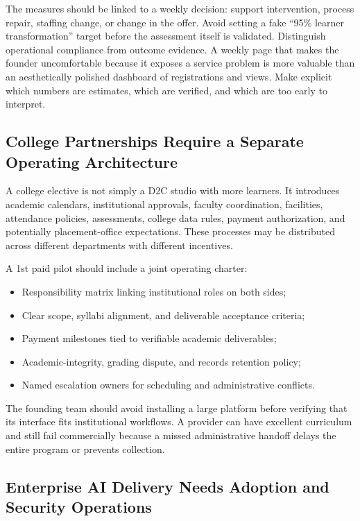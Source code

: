 The measures should be linked to a weekly decision: support intervention, process repair, staffing change, or change in the offer. Avoid setting a fake ``95\% learner transformation'' target before the assessment itself is validated. Distinguish operational compliance from outcome evidence. A weekly page that makes the founder uncomfortable because it exposes a service problem is more valuable than an aesthetically polished dashboard of registrations and views. Make explicit which numbers are estimates, which are verified, and which are too early to interpret.

\subsection{College Partnerships Require a Separate Operating Architecture}
\label{sec:bayes_college_partnerships}

A college elective is not simply a D2C studio with more learners. It introduces academic calendars, institutional approvals, faculty coordination, facilities, attendance policies, assessments, college data rules, payment authorization, and potentially placement-office expectations. These processes may be distributed across different departments with different incentives.

A 1st paid pilot should include a joint operating charter:
\begin{itemize}
    \item Responsibility matrix linking institutional roles on both sides;
    \item Clear scope, syllabi alignment, and deliverable acceptance criteria;
    \item Payment milestones tied to verifiable academic deliverables;
    \item Academic-integrity, grading dispute, and records retention policy;
    \item Named escalation owners for scheduling and administrative conflicts.
\end{itemize}

The founding team should avoid installing a large platform before verifying that its interface fits institutional workflows. A provider can have excellent curriculum and still fail commercially because a missed administrative handoff delays the entire program or prevents collection.

\subsection{Enterprise AI Delivery Needs Adoption and Security Operations}
\label{sec:bayes_enterprise_delivery}

